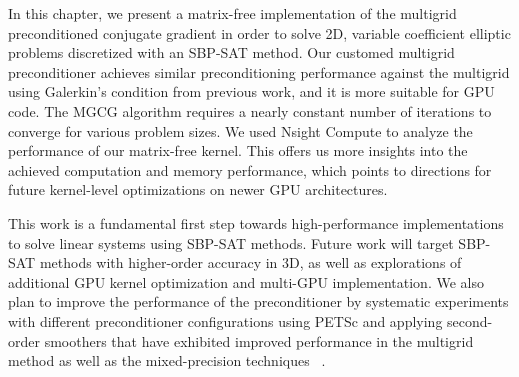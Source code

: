 In this chapter, we present a matrix-free implementation of the multigrid preconditioned conjugate gradient in order to solve 2D, variable coefficient elliptic problems discretized with an SBP-SAT method.
Our customed multigrid preconditioner achieves similar preconditioning performance against the multigrid using Galerkin's condition from previous work, and it is more suitable for GPU code.
The MGCG algorithm requires a nearly constant number of iterations to converge for various problem sizes. 
We used Nsight Compute to analyze the performance of our matrix-free kernel. This offers us more insights into the achieved computation and memory performance, which points to directions for future kernel-level optimizations on newer GPU architectures.

This work is a fundamental first step towards high-performance implementations to solve linear systems using SBP-SAT methods. Future work will target SBP-SAT methods with higher-order accuracy in 3D, as well as explorations of additional GPU kernel optimization and multi-GPU implementation. We also plan to improve the performance of the preconditioner by systematic experiments with different preconditioner configurations using PETSc and applying second-order smoothers that have exhibited improved performance in the multigrid method as well as the mixed-precision techniques ~\cite{golub1961chebyshev,gutknecht2002chebyshev,abdelfattah2021survey}.